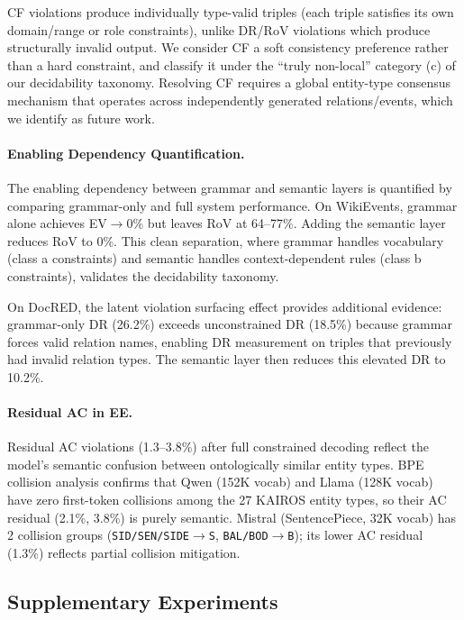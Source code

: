 \documentclass[11pt,a4paper]{article}
\begin{document}
CF violations produce individually type-valid triples (each triple satisfies its own domain/range or role constraints), unlike DR/RoV violations which produce structurally invalid output. We consider CF a soft consistency preference rather than a hard constraint, and classify it under the ``truly non-local'' category (c) of our decidability taxonomy. Resolving CF requires a global entity-type consensus mechanism that operates across independently generated relations/events, which we identify as future work.

\paragraph{Enabling Dependency Quantification.}
The enabling dependency between grammar and semantic layers is quantified by comparing grammar-only and full system performance. On WikiEvents, grammar alone achieves EV$\to$0\% but leaves RoV at 64--77\%. Adding the semantic layer reduces RoV to 0\%. This clean separation, where grammar handles vocabulary (class a constraints) and semantic handles context-dependent rules (class b constraints), validates the decidability taxonomy.

On DocRED, the latent violation surfacing effect provides additional evidence: grammar-only DR (26.2\%) exceeds unconstrained DR (18.5\%) because grammar forces valid relation names, enabling DR measurement on triples that previously had invalid relation types. The semantic layer then reduces this elevated DR to 10.2\%.

\paragraph{Residual AC in EE.}
Residual AC violations (1.3--3.8\%) after full constrained decoding reflect the model's semantic confusion between ontologically similar entity types. BPE collision analysis confirms that Qwen (152K vocab) and Llama (128K vocab) have zero first-token collisions among the 27 KAIROS entity types, so their AC residual (2.1\%, 3.8\%) is purely semantic. Mistral (SentencePiece, 32K vocab) has 2 collision groups (\texttt{SID/SEN/SIDE}$\to$\texttt{S}, \texttt{BAL/BOD}$\to$\texttt{B}); its lower AC residual (1.3\%) reflects partial collision mitigation.

\subsection{Supplementary Experiments}
\label{sec:supplementary}
\end{document}
